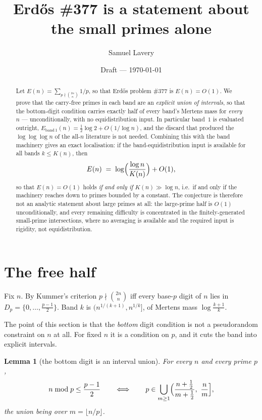 \documentclass[11pt]{article}
\title{Erd\H{o}s \#377 is a statement about the small primes alone}
\author{Samuel Lavery}
\date{Draft --- \today}
\newtheorem{lemma}[theorem]{Lemma}
\begin{document}
\maketitle

\begin{abstract}
Let $E(n)=\sum_{p\nmid\binom{2n}{n}}1/p$, so that Erd\H{o}s problem \#377 is
$E(n)=O(1)$.  We prove that the carry-free primes in each band are an
\emph{explicit union of intervals}, so that the bottom-digit condition carries
exactly half of every band's Mertens mass for \emph{every} $n$ ---
unconditionally, with no equidistribution input.  In particular band~$1$
is evaluated outright, $E_{\mathrm{band}\,1}(n)=\tfrac12\log2+O(1/\log n)$,
and the discard that produced the $\log\log\log n$ of the all-$n$ literature is
not needed.  Combining this with the band machinery gives an exact localisation:
if the band-equidistribution input is available for all bands $k\le K(n)$, then
\[
  E(n)\;=\;\log\Bigl(\frac{\log n}{K(n)}\Bigr)+O(1),
\]
so that $E(n)=O(1)$ holds \emph{if and only if} $K(n)\gg\log n$, i.e.\ if and
only if the machinery reaches down to primes bounded by a constant.  The
conjecture is therefore not an analytic statement about large primes at all:
the large-prime half is $O(1)$ unconditionally, and every remaining difficulty
is concentrated in the finitely-generated small-prime intersections, where no
averaging is available and the required input is rigidity, not equidistribution.
\end{abstract}

\section{The free half}

Fix $n$.  By Kummer's criterion $p\nmid\binom{2n}{n}$ iff every base-$p$ digit
of $n$ lies in $D_p=\{0,\dots,\frac{p-1}2\}$.  Band $k$ is
$(n^{1/(k+1)},n^{1/k}]$, of Mertens mass $\log\frac{k+1}{k}$.

The point of this section is that the \emph{bottom} digit condition is not a
pseudorandom constraint on $n$ at all.  For fixed $n$ it is a condition on
$p$, and it cuts the band into explicit intervals.

\begin{lemma}[the bottom digit is an interval union]\label{lem:intervals}
For every $n$ and every prime $p$,
\[
  n\bmod p\le\frac{p-1}2
  \qquad\Longleftrightarrow\qquad
  p\in\bigcup_{m\ge1}\Bigl(\frac{n+\tfrac12}{m+\tfrac12},\ \frac nm\Bigr],
\]
the union being over $m=\lfloor n/p\rfloor$.
\end{lemma}
\end{document}
